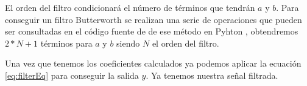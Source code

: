 El orden del filtro condicionará el número de términos que tendrán $a$ y $b$. Para conseguir un filtro Butterworth se realizan una serie de operaciones que pueden ser consultadas en el código fuente de de ese método en Pyhton \cite{REF} %
, obtendremos $2*N+1$ términos para $a$ y $b$ siendo $N$ el orden del filtro.

Una vez que tenemos los coeficientes calculados ya podemos aplicar la ecuación \ref{eq:filterEq} para conseguir la salida $y$. Ya tenemos nuestra señal filtrada.




